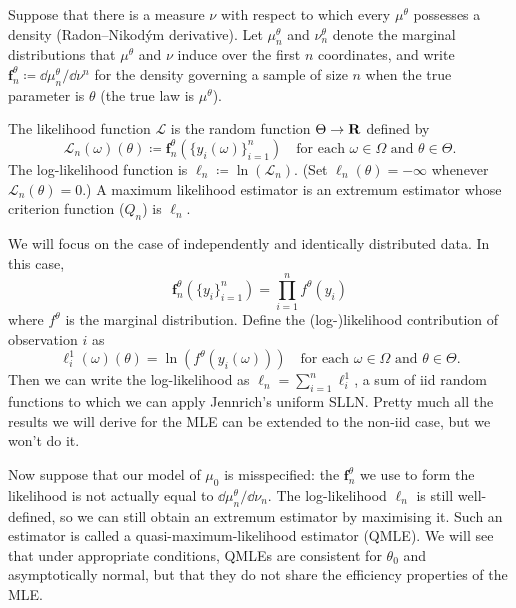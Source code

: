 \documentclass[11pt,letterpaper,reqno,oneside]{article}
\begin{document}
Suppose that there is a measure $\nu$ with respect to which every $\mu^\theta$ possesses a density (Radon--Nikod\'{y}m derivative). Let $\mu^\theta_n$ and $\nu^\theta_n$ denote the marginal distributions that $\mu^\theta$ and $\nu$ induce over the first $n$ coordinates, and write $\boldsymbol{f}^\theta_n \coloneqq \dd \mu^\theta_n / \dd \nu^n$ for the density governing a sample of size $n$ when the true parameter is $\theta$ (the true law is $\mu^\theta$).

The likelihood function $\mathcal{L}$ is the random function $\Theta \to \mathbf{R}$ defined by
%
\begin{equation*}
	\mathcal{L}_n(\omega)(\theta) 
	\coloneqq \boldsymbol{f}^\theta_n
	\left( \{y_i(\omega)\}_{i=1}^n \right) 
	\quad\text{for each $\omega \in \Omega$ and $\theta \in \Theta$} .
\end{equation*}
%
The log-likelihood function is $\ell_n \coloneqq \ln\left( \mathcal{L}_n \right)$. (Set $\ell_n(\theta)=-\infty$ whenever $\mathcal{L}_n(\theta)=0$.) A maximum likelihood estimator is an extremum estimator whose criterion function ($Q_n$) is $\ell_n$.


We will focus on the case of independently and identically distributed data. In this case,
%
\begin{equation*}
	\boldsymbol{f}^\theta_n \left( \{y_i\}_{i=1}^n \right) 
	= \prod_{i=1}^n f^\theta \left( y_i \right)
\end{equation*}
%
where $f^\theta$ is the marginal distribution. Define the (log-)likelihood contribution of observation $i$ as
%
\begin{equation*}
	\ell^1_i(\omega)(\theta) 
	= \ln\left( f^\theta \left( y_i(\omega) \right) \right)
	\quad\text{for each $\omega \in \Omega$ and $\theta \in \Theta$} .
\end{equation*}
%
Then we can write the log-likelihood as $\ell_n = \sum_{i=1}^n \ell^1_i$, a sum of iid random functions to which we can apply Jennrich's uniform SLLN. Pretty much all the results we will derive for the MLE can be extended to the non-iid case, but we won't do it.


Now suppose that our model of $\mu_0$ is misspecified: the $\boldsymbol{f}^\theta_n$ we use to form the likelihood is not actually equal to $\dd \mu^\theta_n / \dd \nu_n$. The log-likelihood $\ell_n$ is still well-defined, so we can still obtain an extremum estimator by maximising it. Such an estimator is called a quasi-maximum-likelihood estimator (QMLE). We will see that under appropriate conditions, QMLEs are consistent for $\theta_0$ and asymptotically normal, but that they do not share the efficiency properties of the MLE.
\end{document}
